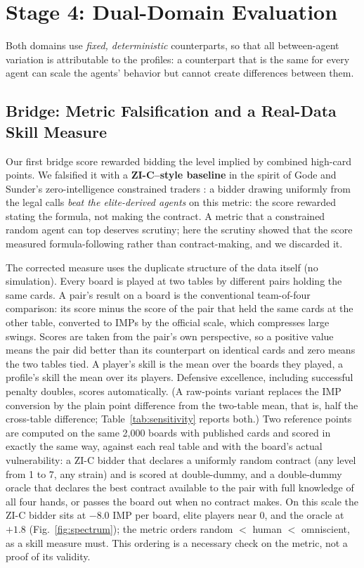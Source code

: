 \documentclass[11pt,a4paper]{article}
\begin{document}
\section{Stage 4: Dual-Domain Evaluation}\label{sec:stage4}

Both domains use \emph{fixed, deterministic} counterparts, so that all
between-agent variation is attributable to the profiles: a counterpart
that is the same for every agent can scale the agents' behavior but
cannot create differences between them.

\subsection{Bridge: Metric Falsification and a Real-Data Skill Measure}\label{sec:bridgemetric}

Our first bridge score rewarded bidding the level implied by combined
high-card points. We falsified it with a \textbf{ZI-C--style baseline}
in the spirit of Gode and Sunder's zero-intelligence constrained traders
\cite{gode1993zi}: a bidder drawing uniformly from the legal calls
\emph{beat the elite-derived agents} on this metric: the score
rewarded stating the formula, not making the contract. A metric that a
constrained random agent can top deserves scrutiny; here the scrutiny
showed that the score measured formula-following rather than
contract-making, and we discarded it.

The corrected measure uses the duplicate structure of the data itself
(no simulation). Every board is played at two tables by different
pairs holding the same cards. A pair's result on a board is the
conventional team-of-four comparison: its score minus the score of the
pair that held the same cards at the other table, converted to IMPs by
the official scale, which compresses large swings. Scores are taken
from the pair's own perspective, so a positive value means the pair
did better than its counterpart on identical cards and zero means the
two tables tied. A player's skill is the mean over the boards they
played, a profile's skill the mean over its players. Defensive
excellence, including successful penalty doubles, scores
automatically. (A raw-points variant replaces the IMP conversion by
the plain point difference from the two-table mean, that is, half the
cross-table difference; Table~\ref{tab:sensitivity} reports both.) Two
reference points are computed on the same 2{,}000 boards with
published cards and scored in exactly the same way, against each real
table and with the board's actual vulnerability: a ZI-C bidder that
declares a uniformly random contract (any level from 1 to 7, any
strain) and is scored at double-dummy, and a double-dummy oracle
\cite{ginsberg2001gib} that declares the best contract available to
the pair with full knowledge of all four hands, or passes the board out
when no contract makes. On this scale the ZI-C
bidder sits at $-8.0$ IMP per board, elite players near $0$, and the
oracle at $+1.8$ (Fig.~\ref{fig:spectrum}); the metric orders random
$<$ human $<$ omniscient, as a skill measure must. This ordering is a
necessary check on the metric, not a proof of its validity.
\end{document}
